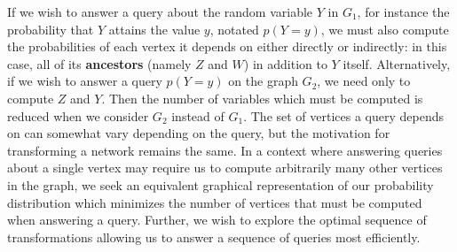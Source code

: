 \begin{figure}[h!]
\begin{center}
\end{center}
\caption{}
\label{fig:introcomparison}
\end{figure}
\null \quad \quad If we wish to answer a query about the random variable $Y$ in $G_{1}$, for instance the probability that $Y$ attains the value $y$, notated $p(Y=y)$, we must also compute the probabilities of each vertex it depends on either directly or indirectly: in this case, all of its \textbf{ancestors} (namely $Z$ and $W$) in addition to $Y$ itself. Alternatively, if we wish to answer a query $p(Y=y)$ on the graph $G_{2}$, we need only to compute $Z$ and $Y$. Then the number of variables which must be computed is reduced when we consider $G_{2}$ instead of $G_{1}$. The set of vertices a query depends on can somewhat vary depending on the query, but the motivation for transforming a network remains the same. \newline
\newpage
\null \quad \quad In a context where answering queries about a single vertex may require us to compute arbitrarily many other vertices in the graph, we seek an equivalent graphical representation of our probability distribution which minimizes the number of vertices that must be computed when answering a query. Further, we wish to explore the optimal sequence of transformations allowing us to answer a sequence of queries most efficiently. 

